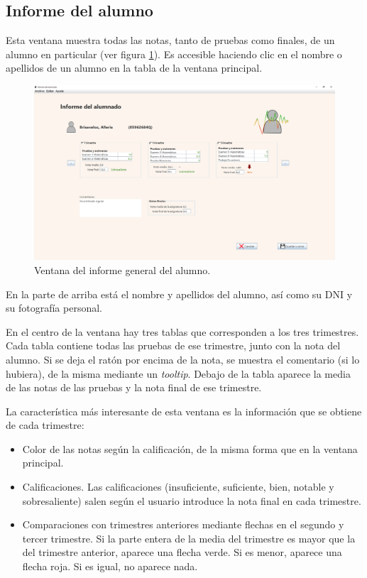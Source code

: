 \subsection{Informe del alumno}
Esta ventana muestra todas las notas, tanto de pruebas como finales, de un alumno en particular (ver figura \ref{Fig:informealumno}). Es accesible haciendo clic en el nombre o apellidos de un alumno en la tabla de la ventana principal.

\begin{figure}[h]
\centering\includegraphics[width=1\linewidth]{figs/informealumno.png}
\caption{Ventana del informe general del alumno.}
\label{Fig:informealumno}
\end{figure}

En la parte de arriba está el nombre y apellidos del alumno, así como su DNI y su fotografía personal.

En el centro de la ventana hay tres tablas que corresponden a los tres trimestres. Cada tabla contiene todas las pruebas de ese trimestre, junto con la nota del alumno. Si se deja el ratón por encima de la nota, se muestra el comentario (si lo hubiera), de la misma mediante un \textit{tooltip}. Debajo de la tabla aparece la media de las notas de las pruebas y la nota final de ese trimestre.

La característica más interesante de esta ventana es la información que se obtiene de cada trimestre:
\begin{itemize}
	\item{Color de las notas según la calificación,} de la misma forma que en la ventana principal.
	\item{Calificaciones}. Las calificaciones (insuficiente, suficiente, bien, notable y sobresaliente) salen según el usuario introduce la nota final en cada trimestre.
	\item{Comparaciones con trimestres anteriores} mediante flechas en el segundo y tercer trimestre. Si la parte entera de la media del trimestre es mayor que la del trimestre anterior, aparece una flecha verde. Si es menor, aparece una flecha roja. Si es igual, no aparece nada.
\end{itemize}

